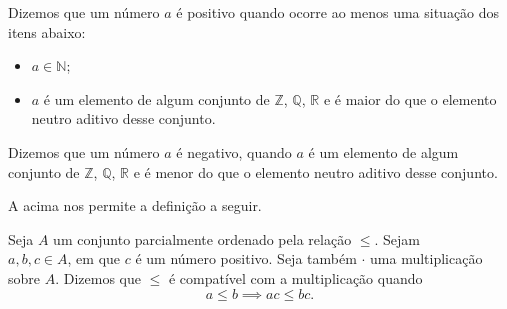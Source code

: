 \documentclass[../main.tex]{subfiles}
\begin{document}
\begin{defi}\label{agb-def-numPositivo}
    Dizemos que um número $a$ é positivo quando ocorre ao menos uma situação dos itens abaixo:
    \begin{itemize}
        \item $a \in \mathbb{N}$;
        \item $a$ é um elemento de algum conjunto de $\mathbb{Z}$, $\mathbb{Q}$, $\mathbb{R}$ e é maior do que o elemento neutro aditivo desse conjunto.
    \end{itemize}
\end{defi}
\begin{defi}\label{agb-def-numNegativo}
    Dizemos que um número $a$ é negativo, quando $a$ é um elemento de algum conjunto de $\mathbb{Z}$, $\mathbb{Q}$, $\mathbb{R}$ e é menor do que o elemento neutro aditivo desse conjunto.
\end{defi}
A  acima nos permite a definição a seguir.
\begin{defi}\label{agb-def-ordemCompativelProduto}
    Seja $A$ um conjunto parcialmente ordenado pela relação $\leq$. Sejam \\ $a,b,c \in A$, em que $c$ é um número positivo. Seja também $\cdot$ uma multiplicação sobre $A$.
    Dizemos que $\leq$ é compatível com a multiplicação quando 
    \[ a \leq b \implies ac \leq bc. \]
\end{defi}



\end{document}

